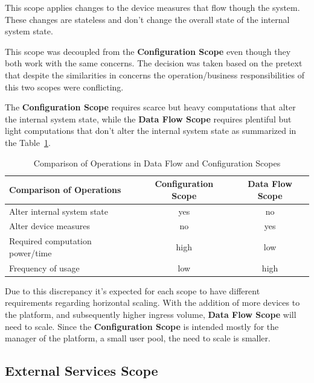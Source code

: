 This scope applies changes to the device measures that flow though the system. These changes are stateless and don't change the overall state of the internal system state.

This scope was decoupled from the \textbf{Configuration Scope} even though they both work with the same concerns. The decision was taken based on the pretext that despite the similarities in concerns the operation/business responsibilities of this two scopes were conflicting.

The \textbf{Configuration Scope} requires scarce but heavy computations that alter the internal system state, while the \textbf{Data Flow Scope} requires plentiful but light computations that don't alter the internal system state as summarized in the Table~\ref{tab:design:system_scopes:data_flow_scope:comparison}.

\begin{table}[H]
   \caption[Comparison of Operations in Data Flow and Configuration Scopes]{Comparison of Operations in Data Flow and Configuration Scopes}
   \label{tab:design:system_scopes:data_flow_scope:comparison}
   \centering
   \begin{tabular}{@{}lcc@{}}
   \toprule
   \textbf{Comparison of Operations} & \textbf{Configuration Scope} & \textbf{Data Flow Scope} \\ \midrule
       Alter internal system state & yes & no \\ \hline
       Alter device measures & no & yes \\ \hline
       Required computation power/time & high & low \\ \hline
       Frequency of usage & low & high \\ \hline
   \end{tabular}
\end{table}

Due to this discrepancy it's expected for each scope to have different requirements regarding horizontal scaling. With the addition of more devices to the platform, and subsequently higher ingress volume, \textbf{Data Flow Scope} will need to scale. Since the \textbf{Configuration Scope} is intended mostly for the manager of the platform, a small user pool, the need to scale is smaller.

\subsection{External Services Scope}
\label{subsec:design:system_scopes:service_scope}

